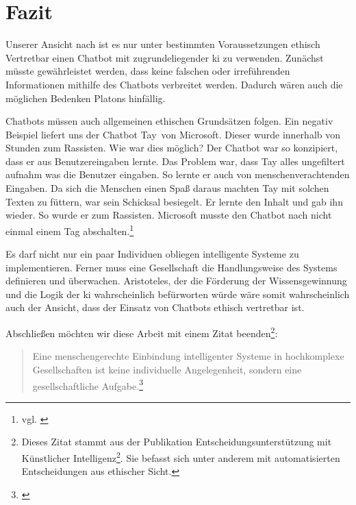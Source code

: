 \section{Fazit}
Unserer Ansicht nach ist es nur unter bestimmten Voraussetzungen ethisch Vertretbar einen Chatbot mit zugrundeliegender \ac{ki} zu verwenden.
Zunächst müsste gewährleistet werden, dass keine falschen oder irreführenden Informationen mithilfe des Chatbots verbreitet werden. Dadurch wären auch die möglichen Bedenken Platons hinfällig. 

Chatbots müssen auch allgemeinen ethischen Grundsätzen folgen. Ein negativ Beispiel liefert uns der Chatbot \glqq Tay\grqq\ von Microsoft. Dieser wurde innerhalb von Stunden zum Rassisten. Wie war dies möglich? Der Chatbot war so konzipiert, dass er aus Benutzereingaben lernte. Das Problem war, dass Tay alles ungefiltert aufnahm was die Benutzer eingaben. So lernte er auch von menschenverachtenden Eingaben. Da sich die Menschen einen Spaß daraus machten Tay mit solchen Texten zu \glqq füttern\grqq, war sein Schicksal besiegelt. Er lernte den Inhalt und gab ihn wieder. So wurde er zum Rassisten. Microsoft musste den Chatbot nach nicht einmal einem Tag abschalten.\footnote{vgl. \cite{TaySpiegel}} 

Es darf nicht nur ein paar Individuen obliegen intelligente Systeme zu implementieren. Ferner muss eine Gesellschaft die Handlungsweise des Systems definieren und überwachen. 
Aristoteles, der die Förderung der Wissensgewinnung und die Logik der \ac{ki} wahrscheinlich befürworten würde wäre somit wahrscheinlich auch der Ansicht, dass der Einsatz von Chatbots ethisch vertretbar ist.

Abschließen möchten wir diese Arbeit mit einem Zitat beenden\footnote{Dieses Zitat stammt aus der Publikation \glqq Entscheidungsunterstützung mit Künstlicher Intelligenz\grqq\footnote{vgl. \cite{Bitkom}}. Sie befasst sich unter anderem mit automatisierten Entscheidungen aus ethischer Sicht.}:
\begin{quote}
	 \glqq Eine menschengerechte Einbindung intelligenter Systeme in hochkomplexe Gesellschaften ist keine individuelle Angelegenheit, sondern eine gesellschaftliche Aufgabe.\grqq\footnote{\cite{BitkomZitat}}
\end{quote}
